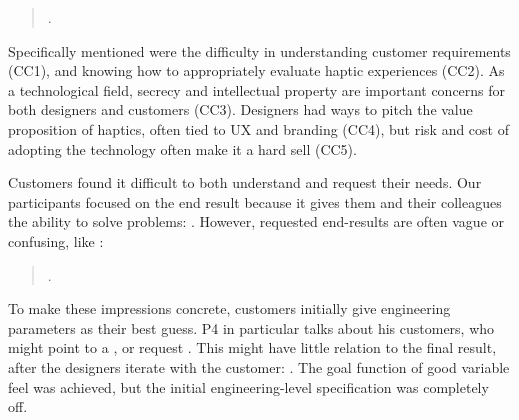 \begin{quote}
    .
\end{quote}


Specifically mentioned were the difficulty in understanding customer requirements (CC1), and knowing how to appropriately evaluate haptic experiences (CC2).
As a technological field, secrecy and intellectual property are important concerns for both designers and customers (CC3).
Designers had ways to pitch the value proposition of haptics, often tied to UX and branding (CC4), but risk and cost of adopting the technology often make it a hard sell (CC5).


\label{sec:interviews:express}
Customers found it difficult to both understand and request their needs.
Our participants focused on the end result because it gives them and their colleagues the ability to solve problems: .
However, requested end-results are often vague or confusing, like :

\begin{quote}
    .
\end{quote}

To make these impressions concrete, customers initially give engineering parameters as their best guess.
P4 in particular talks about his customers, who might point to a , or
request .
This might have little relation to the final result, after the designers iterate with the customer: .
The goal function of good variable feel was achieved, but the initial engineering-level specification was completely off.

